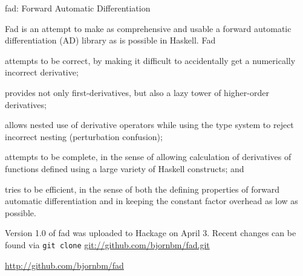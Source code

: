 \documentclass{article}
\begin{document}
\begin{hcarentry}{fad: Forward Automatic Differentiation}
\makeheader


Fad is an attempt to make as comprehensive and usable a forward
automatic differentiation (AD) library as is possible in Haskell.  Fad
\begin{inparaenum}[(a)]
\item attempts to be correct, by making it difficult to accidentally
  get a numerically incorrect derivative;
\item provides not only first-derivatives, but also a lazy tower of
  higher-order derivatives;
\item allows nested use of derivative operators while using the type
  system to reject incorrect nesting (perturbation confusion);
\item attempts to be complete, in the sense of allowing calculation of
  derivatives of functions defined using a large variety of Haskell
  constructs; and
\item tries to be efficient, in the sense of both the defining
  properties of forward automatic differentiation and in keeping the
  constant factor overhead as low as possible.
\end{inparaenum}


Version 1.0 of fad was uploaded to Hackage on April 3. Recent changes
can be found via \texttt{git clone} \url{git://github.com/bjornbm/fad.git}



\FurtherReading
  \url{http://github.com/bjornbm/fad}
\end{hcarentry}
\end{document}
